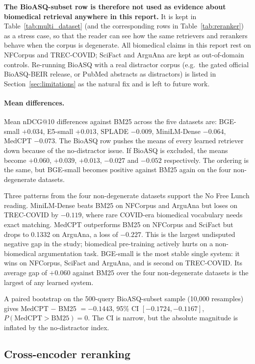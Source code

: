 \documentclass[11pt,a4paper]{article}
\begin{document}
\textbf{The BioASQ-subset row is therefore not used as evidence about
biomedical retrieval anywhere in this report.} It is kept in
Table~\ref{tab:multi_dataset} (and the corresponding rows in
Table~\ref{tab:reranker}) as a stress case, so that the reader can see
how the same retrievers and rerankers behave when the corpus is
degenerate. All biomedical claims in this report rest on NFCorpus and
TREC-COVID; SciFact and ArguAna are kept as out-of-domain controls.
Re-running BioASQ with a real distractor corpus (e.g.\ the gated
official BioASQ-BEIR release, or PubMed abstracts as distractors) is
listed in Section~\ref{sec:limitations} as the natural fix and is left
to future work.

\paragraph{Mean differences.}
Mean nDCG@10 differences against BM25 across the five datasets are:
BGE-small $+0.034$, E5-small $+0.013$, SPLADE $-0.009$, MiniLM-Dense
$-0.064$, MedCPT $-0.073$. The BioASQ row pushes the means of every
learned retriever down because of the no-distractor issue. If BioASQ
is excluded, the means become $+0.060$, $+0.039$, $+0.013$, $-0.027$
and $-0.052$ respectively. The ordering is the same, but BGE-small
becomes positive against BM25 again on the four non-degenerate
datasets.

Three patterns from the four non-degenerate datasets support the No
Free Lunch reading. MiniLM-Dense beats BM25 on NFCorpus and ArguAna
but loses on TREC-COVID by $-0.119$, where rare COVID-era biomedical
vocabulary needs exact matching. MedCPT outperforms BM25 on NFCorpus
and SciFact but drops to 0.1332 on ArguAna, a loss of $-0.227$. This
is the largest undisputed negative gap in the study; biomedical
pre-training actively hurts on a non-biomedical argumentation task.
BGE-small is the most stable single system: it wins on NFCorpus,
SciFact and ArguAna, and is second on TREC-COVID. Its average gap of
$+0.060$ against BM25 over the four non-degenerate datasets is the
largest of any learned system.

A paired bootstrap on the 500-query BioASQ-subset sample (10{,}000
resamples) gives MedCPT $-$ BM25 $= -0.1443$, 95\% CI $[-0.1724,
-0.1167]$, $P(\text{MedCPT}>\text{BM25})=0$. The CI is narrow, but
the absolute magnitude is inflated by the no-distractor index.

\subsection{Cross-encoder reranking}
\label{subsec:reranker}
\end{document}
